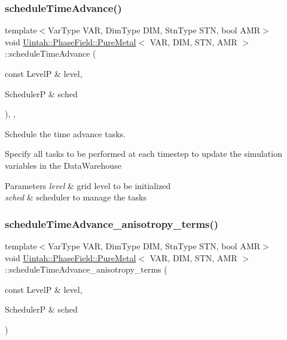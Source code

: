 \subsubsection{\texorpdfstring{schedule\+Time\+Advance()}{scheduleTimeAdvance()}}
{\footnotesize\ttfamily template$<$Var\+Type V\+AR, Dim\+Type D\+IM, Stn\+Type S\+TN, bool A\+MR$>$ \\
void \hyperlink{classUintah_1_1PhaseField_1_1PureMetal}{Uintah\+::\+Phase\+Field\+::\+Pure\+Metal}$<$ V\+AR, D\+IM, S\+TN, A\+MR $>$\+::schedule\+Time\+Advance (\begin{DoxyParamCaption}\item[{const LevelP \&}]{level,  }\item[{SchedulerP \&}]{sched }\end{DoxyParamCaption})\hspace{0.3cm}{\ttfamily [override]}, {\ttfamily [protected]}, {\ttfamily [virtual]}}



Schedule the time advance tasks. 

Specify all tasks to be performed at each timestep to update the simulation variables in the Data\+Warehouse


\begin{DoxyParams}{Parameters}
{\em level} & grid level to be initialized \\
\hline
{\em sched} & scheduler to manage the tasks \\
\hline
\end{DoxyParams}
\mbox{\label{classUintah_1_1PhaseField_1_1PureMetal_a8663499001f2e89f6ce1c9b1084fc3c5}} 
\subsubsection{\texorpdfstring{schedule\+Time\+Advance\+\_\+anisotropy\+\_\+terms()}{scheduleTimeAdvance\_anisotropy\_terms()}}
{\footnotesize\ttfamily template$<$Var\+Type V\+AR, Dim\+Type D\+IM, Stn\+Type S\+TN, bool A\+MR$>$ \\
void \hyperlink{classUintah_1_1PhaseField_1_1PureMetal}{Uintah\+::\+Phase\+Field\+::\+Pure\+Metal}$<$ V\+AR, D\+IM, S\+TN, A\+MR $>$\+::schedule\+Time\+Advance\+\_\+anisotropy\+\_\+terms (\begin{DoxyParamCaption}\item[{const LevelP \&}]{level,  }\item[{SchedulerP \&}]{sched }\end{DoxyParamCaption})\hspace{0.3cm}{\ttfamily [protected]}}



